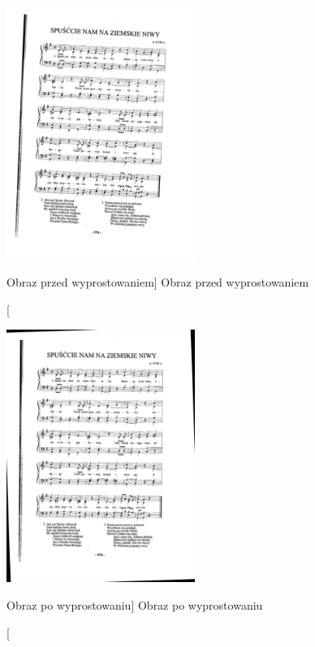 \documentclass[a4paper,12pt]{article}
\begin{document}
        		\begin{figure}[!ht]  
        		    \begin{center}
        			    \includegraphics[height=8.25cm, frame]{image//exampleImage//003_a.png} 
        		    \end{center}
        		    \caption
        			    [Obraz przed wyprostowaniem]  
            			{Obraz przed wyprostowaniem}  
        	    \end{figure}
        			
                \begin{figure}[!ht]  
        		    \begin{center}
        			    \includegraphics[height=8.25cm, frame] {image//exampleImage//003_b.png} 
        		    \end{center}
        			\caption
            			[Obraz po wyprostowaniu]  
            			{Obraz po wyprostowaniu}  
        	    \end{figure} 
		
\end{document}
